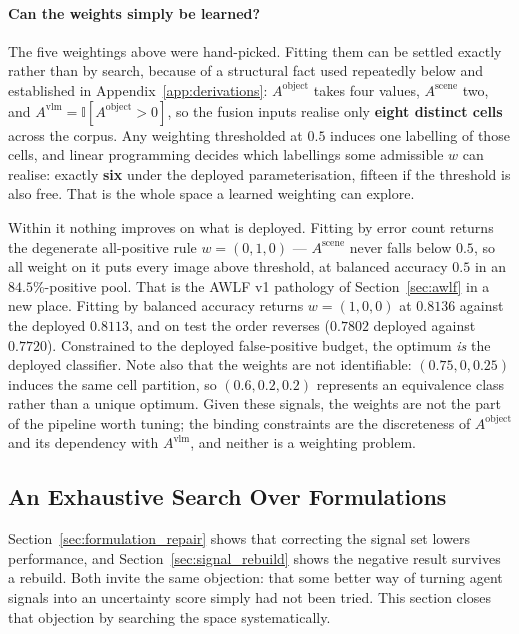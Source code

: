 \documentclass[12pt,a4paper]{report}
\begin{document}
\paragraph{Can the weights simply be learned?} The five weightings above were hand-picked. Fitting
them can be settled exactly rather than by search, because of a structural fact used repeatedly
below and established in Appendix~\ref{app:derivations}: $A^{\text{object}}$ takes four values,
$A^{\text{scene}}$ two, and $A^{\text{vlm}} = \mathbb{I}[A^{\text{object}}>0]$, so the fusion
inputs realise only \textbf{eight distinct cells} across the corpus. Any weighting thresholded at
$0.5$ induces one labelling of those cells, and linear programming decides which labellings some
admissible $w$ can realise: exactly \textbf{six} under the deployed parameterisation, fifteen if
the threshold is also free. That is the whole space a learned weighting can explore.

Within it nothing improves on what is deployed. Fitting by error count returns the degenerate
all-positive rule $w=(0,1,0)$ --- $A^{\text{scene}}$ never falls below $0.5$, so all weight on it
puts every image above threshold, at balanced accuracy $0.5$ in an $84.5\%$-positive pool. That is
the AWLF v1 pathology of Section~\ref{sec:awlf} in a new place. Fitting by balanced accuracy
returns $w=(1,0,0)$ at $0.8136$ against the deployed $0.8113$, and on test the order reverses
($0.7802$ deployed against $0.7720$). Constrained to the deployed false-positive budget, the
optimum \emph{is} the deployed classifier. Note also that the weights are not identifiable:
$(0.75,0,0.25)$ induces the same cell partition, so $(0.6,0.2,0.2)$ represents an equivalence
class rather than a unique optimum. Given these signals, the weights are not the part of the
pipeline worth tuning; the binding constraints are the discreteness of $A^{\text{object}}$ and its
dependency with $A^{\text{vlm}}$, and neither is a weighting problem.

\subsection{An Exhaustive Search Over Formulations}
\label{sec:formulation_search}

Section~\ref{sec:formulation_repair} shows that correcting the signal set lowers performance, and
Section~\ref{sec:signal_rebuild} shows the negative result survives a rebuild. Both invite the
same objection: that some better way of turning agent signals into an uncertainty score simply
had not been tried. This section closes that objection by searching the space systematically.
\end{document}
